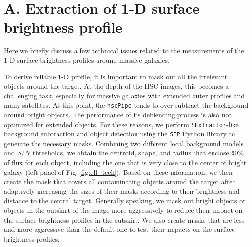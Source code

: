 \documentclass[a4paper,fleqn,usenatbib]{mnras}
\begin{document}





\appendix
    
\section{A. Extraction of 1-D surface brightness profile} 
    \label{app:ellipse} 
    
    Here we briefly discuss a few technical issues related to the measurements of the 
    1-D surface brightness profiles around massive galaxies. 
    
    To derive reliable 1-D profile, it is important to mask out all the irrelevant 
    objects around the target.
    At the depth of the HSC images, this becomes a challenging task, especially 
    for massive galaxies with extended outer profiles and many satellites. 
    At this point, the \texttt{hscPipe} tends to over-subtract the background around 
    bright objects.  
    The performance of its deblending process is also not optimized for extended
    objects. 
    For these reasons, we perform \texttt{SExtractor}-like background subtraction and 
    object detection using the \texttt{SEP} Python library to generate the necessary 
    masks.
    Combining two different local background models and $S/N$ thresholds, we obtain 
    the centroid, shape, and radius that enclose 90\% of flux for each object, 
    including the one that is very close to the center of bright galaxy (left panel of 
    Fig~\ref{fig:ell_tech}). 
    Based on these information, we then create the mask that covers all contaminating 
    objects around the target after adaptively increasing the sizes of their masks 
    according to their brightness and distance to the central target. 
    Generally speaking, we mask out bright objects or objects in the outskirt of the 
    image more aggressively to reduce their impact on the surface brightness profiles 
    in the outskirt. 
    We also create masks that are less and more aggressive than the default one to 
    test their impacts on the surface brightness profiles. 
    
\end{document}
